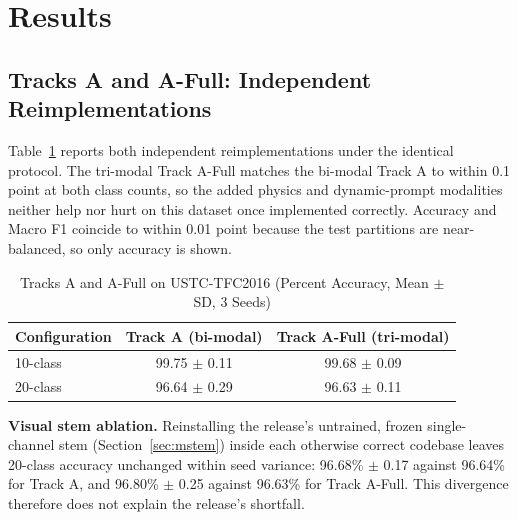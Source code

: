 \documentclass[journal]{IEEEtran}
\begin{document}
\section{Results}\label{sec:results}

\subsection{Tracks A and A-Full: Independent Reimplementations}\label{sec:rafull}
Table~\ref{tab:a} reports both independent reimplementations under the identical protocol. The tri-modal Track A-Full matches the bi-modal Track A to within 0.1 point at both class counts, so the added physics and dynamic-prompt modalities neither help nor hurt on this dataset once implemented correctly. Accuracy and Macro F1 coincide to within 0.01 point because the test partitions are near-balanced, so only accuracy is shown.

\begin{table}[t]
\caption{Tracks A and A-Full on USTC-TFC2016 (Percent Accuracy, Mean $\pm$ SD, 3 Seeds)}
\label{tab:a}
\centering
\renewcommand{\arraystretch}{1.2}
\begin{tabular}{|l|c|c|}
\hline
\textbf{Configuration} & \textbf{Track A (bi-modal)} & \textbf{Track A-Full (tri-modal)} \\
\hline
10-class & 99.75 $\pm$ 0.11 & 99.68 $\pm$ 0.09 \\
\hline
20-class & 96.64 $\pm$ 0.29 & 96.63 $\pm$ 0.11 \\
\hline
\end{tabular}
\end{table}

\textbf{Visual stem ablation.} Reinstalling the release's untrained, frozen single-channel stem (Section~\ref{sec:mstem}) inside each otherwise correct codebase leaves 20-class accuracy unchanged within seed variance: 96.68\% $\pm$ 0.17 against 96.64\% for Track A, and 96.80\% $\pm$ 0.25 against 96.63\% for Track A-Full. This divergence therefore does not explain the release's shortfall.
\end{document}
